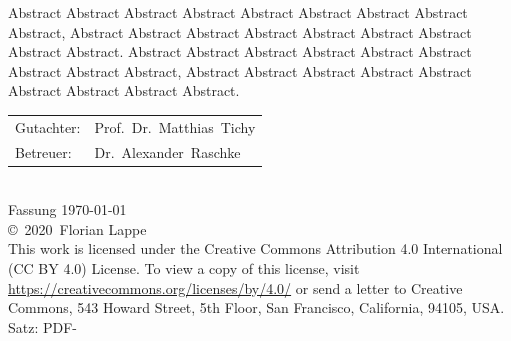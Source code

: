 \documentclass[
a4paper,
numbers=noenddot,      %
bibliography=totoc,              %
BCOR=15mm,               %
leqno					%
]{scrbook}
\newcommand{\fullname}{Florian Lappe}
\newcommand{\jahr}{2020}
\newcommand{\gutachterA}{Prof.\ Dr.\ Matthias\ Tichy}
\newcommand{\betreuer}{Dr.\ Alexander\ Raschke}
\begin{document}
Abstract Abstract Abstract Abstract Abstract Abstract Abstract Abstract Abstract,
Abstract Abstract Abstract Abstract Abstract Abstract Abstract Abstract Abstract.
Abstract Abstract Abstract Abstract Abstract Abstract Abstract Abstract Abstract,
Abstract Abstract Abstract Abstract Abstract Abstract Abstract Abstract Abstract.

  {
    \null
    \small
    \vfill
    \begin{center}
      \begin{tabular}{l l}
        Gutachter: & \gutachterA \\
        Betreuer:  & \betreuer   \\
      \end{tabular}\\[1cm]
      Fassung \today\\
      \copyright~\jahr~\fullname\\[0.5em]
      This work is licensed under the Creative Commons Attribution 4.0 International (CC BY 4.0) License. To view a copy of this license, visit \href{https://creativecommons.org/licenses/by/4.0/}{https://creativecommons.org/licenses/by/4.0/} or send a letter to Creative Commons, 543 Howard Street, 5th Floor, San Francisco, California, 94105, USA. \\

      Satz: PDF-\LaTeXe
    \end{center}
  }


\tableofcontents

\mainmatter %












\cleardoublepage %
\appendix

\end{document}
